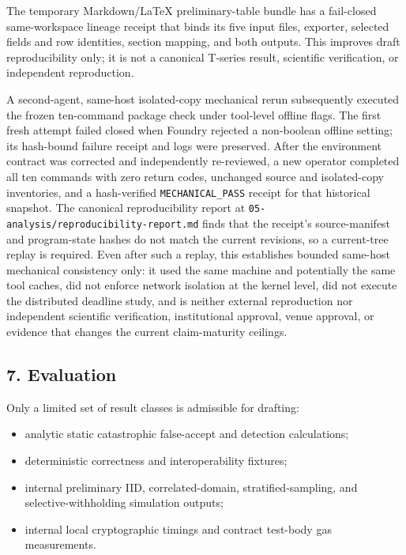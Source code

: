 \documentclass[
]{article}
\providecommand{\tightlist}{%
  \setlength{\itemsep}{0pt}\setlength{\parskip}{0pt}}
\begin{document}
The temporary Markdown/LaTeX preliminary-table bundle has a fail-closed
same-workspace lineage receipt that binds its five input files,
exporter, selected fields and row identities, section mapping, and both
outputs. This improves draft reproducibility only; it is not a canonical
T-series result, scientific verification, or independent reproduction.

A second-agent, same-host isolated-copy mechanical rerun subsequently
executed the frozen ten-command package check under tool-level offline
flags. The first fresh attempt failed closed when Foundry rejected a
non-boolean offline setting; its hash-bound failure receipt and logs
were preserved. After the environment contract was corrected and
independently re-reviewed, a new operator completed all ten commands
with zero return codes, unchanged source and isolated-copy inventories,
and a hash-verified \texttt{MECHANICAL\_PASS} receipt for that
historical snapshot. The canonical reproducibility report at
\texttt{05-analysis/reproducibility-report.md} finds that the receipt's
source-manifest and program-state hashes do not match the current
revisions, so a current-tree replay is required. Even after such a
replay, this establishes bounded same-host mechanical consistency only:
it used the same machine and potentially the same tool caches, did not
enforce network isolation at the kernel level, did not execute the
distributed deadline study, and is neither external reproduction nor
independent scientific verification, institutional approval, venue
approval, or evidence that changes the current claim-maturity ceilings.

\subsection{7. Evaluation}\label{evaluation}

Only a limited set of result classes is admissible for drafting:

\begin{itemize}
\tightlist
\item
  analytic static catastrophic false-accept and detection calculations;
\item
  deterministic correctness and interoperability fixtures;
\item
  internal preliminary IID, correlated-domain, stratified-sampling, and
  selective-withholding simulation outputs;
\item
  internal local cryptographic timings and contract test-body gas
  measurements.
\end{itemize}
\end{document}
